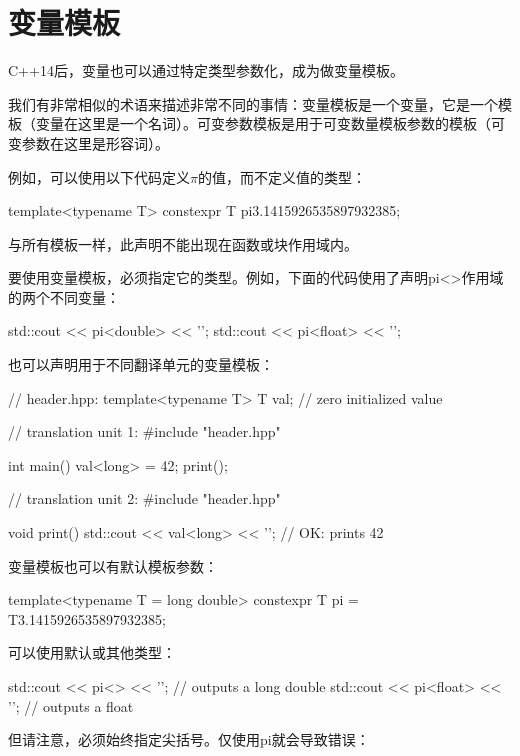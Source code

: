 \section{变量模板}
C++14后，变量也可以通过特定类型参数化，成为做变量模板。

\begin{notice}
我们有非常相似的术语来描述非常不同的事情：变量模板是一个变量，它是一个模板（变量在这里是一个名词）。可变参数模板是用于可变数量模板参数的模板（可变参数在这里是形容词）。
\end{notice}

例如，可以使用以下代码定义$\pi$的值，而不定义值的类型：

\begin{cpp}
template<typename T>
constexpr T pi{3.1415926535897932385};
\end{cpp}

与所有模板一样，此声明不能出现在函数或块作用域内。

要使用变量模板，必须指定它的类型。例如，下面的代码使用了声明pi<>作用域的两个不同变量：

\begin{cpp}
std::cout << pi<double> << '\n';
std::cout << pi<float> << '\n';
\end{cpp}

也可以声明用于不同翻译单元的变量模板：

\begin{cpp}
// header.hpp:
template<typename T> T val{}; // zero initialized value

// translation unit 1:
#include "header.hpp"

int main()
{
	val<long> = 42;
	print();
}

// translation unit 2:
#include "header.hpp"

void print()
{
	std::cout << val<long> << '\n'; // OK: prints 42
}
\end{cpp}

变量模板也可以有默认模板参数：

\begin{cpp}
template<typename T = long double>
constexpr T pi = T{3.1415926535897932385};
\end{cpp}

可以使用默认或其他类型：

\begin{cpp}
std::cout << pi<> << '\n'; // outputs a long double
std::cout << pi<float> << '\n'; // outputs a float
\end{cpp}

但请注意，必须始终指定尖括号。仅使用pi就会导致错误：

